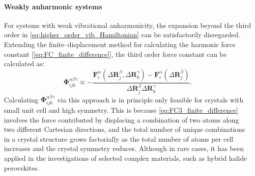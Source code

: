 \paragraph{\textbf{Weakly anharmonic systems}} For systems with weak vibrational anharmonicity, the expansion beyond the third order in \cref{eq:higher_order_vib_Hamiltonian} can be satisfactorily disregarded. Extending the finite--displacement method for calculating the harmonic force constant [\cref{eq:FC_finite_difference}], the third order force constant can be calculated as:
\begin{equation}\label{eq:FC3_finite_difference}
    \bm{\Phi}_{ijk}^{\alpha\beta\gamma}\approx-\frac{\bm{F}_{i}^{\alpha}(\Delta\bm{R}_{j}^{\beta},\Delta\bm{R}_{k}^{\gamma})-\bm{F}_{i}^{\alpha}(\Delta\bm{R}_{j}^{\beta})}{\Delta\bm{R}_{j}^{\beta}\Delta\bm{R}_{k}^{\gamma}}. 
\end{equation}
Calculating $\bm{\Phi}_{ijk}^{\alpha\beta\gamma}$ via this approach is in principle only feasible for crystals with small unit cell and high symmetry. This is because \cref{eq:FC3_finite_difference} involves the force contributed by displacing a combination of two atoms along two different Cartesian directions, and the total number of unique combinations in a crystal structure grows factorially as the total number of atoms per cell increases and the crystal symmetry reduces. Although in rare cases, it has been applied in the investigations of selected complex materials, such as hybrid halide perovskites.\cite{zhu2019mixed}

